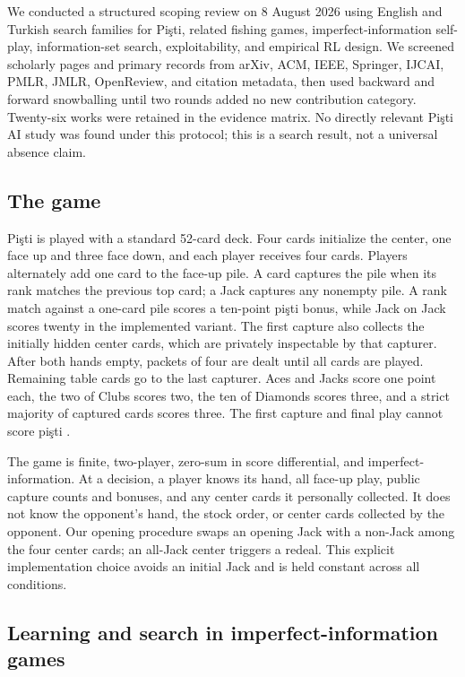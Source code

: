\documentclass[10pt]{article}
\newcommand{\pisti}{Pişti}
\begin{document}
We conducted a structured scoping review on 8 August 2026 using English and Turkish search families for \pisti, related fishing games, imperfect-information self-play, information-set search, exploitability, and empirical RL design. We screened scholarly pages and primary records from arXiv, ACM, IEEE, Springer, IJCAI, PMLR, JMLR, OpenReview, and citation metadata, then used backward and forward snowballing until two rounds added no new contribution category. Twenty-six works were retained in the evidence matrix. No directly relevant \pisti{} AI study was found under this protocol; this is a search result, not a universal absence claim.

\subsection{The game}

\pisti{} is played with a standard 52-card deck. Four cards initialize the center, one face up and three face down, and each player receives four cards. Players alternately add one card to the face-up pile. A card captures the pile when its rank matches the previous top card; a Jack captures any nonempty pile. A rank match against a one-card pile scores a ten-point pişti bonus, while Jack on Jack scores twenty in the implemented variant. The first capture also collects the initially hidden center cards, which are privately inspectable by that capturer. After both hands empty, packets of four are dealt until all cards are played. Remaining table cards go to the last capturer. Aces and Jacks score one point each, the two of Clubs scores two, the ten of Diamonds scores three, and a strict majority of captured cards scores three. The first capture and final play cannot score pişti \cite{pagatpisti}.

The game is finite, two-player, zero-sum in score differential, and imperfect-information. At a decision, a player knows its hand, all face-up play, public capture counts and bonuses, and any center cards it personally collected. It does not know the opponent's hand, the stock order, or center cards collected by the opponent. Our opening procedure swaps an opening Jack with a non-Jack among the four center cards; an all-Jack center triggers a redeal. This explicit implementation choice avoids an initial Jack and is held constant across all conditions.

\subsection{Learning and search in imperfect-information games}
\end{document}
